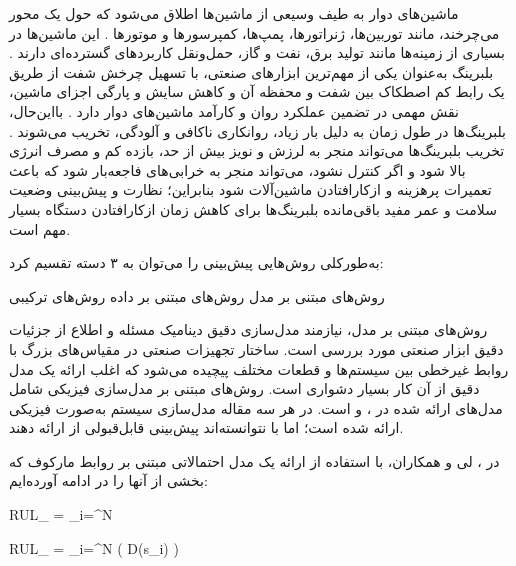 
\label{litreture}



ماشین‌های دوار به طیف وسیعی از ماشین‌ها اطلاق می‌شود که حول یک محور می‌چرخند، مانند توربین‌ها، ژنراتورها، پمپ‌ها، کمپرسورها و موتورها . این ماشین‌ها در بسیاری از زمینه‌ها مانند تولید برق، نفت و گاز، حمل‌ونقل کاربردهای گسترده‌ای دارند . بلبرینگ به‌عنوان یکی از مهم‌ترین ابزارهای صنعتی، با تسهیل چرخش شفت از طریق یک رابط کم اصطکاک بین شفت و محفظه آن و کاهش سایش و پارگی اجزای ماشین، نقش مهمی در تضمین عملکرد روان و کارآمد ماشین‌های دوار دارد . بااین‌حال، بلبرینگ‌ها در طول زمان به دلیل بار زیاد، روانکاری ناکافی و آلودگی، تخریب می‌شوند . تخریب بلبرینگ‌ها می‌تواند منجر به لرزش و نویز بیش از حد، بازده کم و مصرف انرژی بالا شود و اگر کنترل نشود، می‌تواند منجر به خرابی‌های فاجعه‌بار شود که باعث تعمیرات پرهزینه و ازکارافتادن ماشین‌آلات شود  بنابراین؛ نظارت و پیش‌بینی وضعیت سلامت و عمر مفید باقی‌مانده بلبرینگ‌ها برای کاهش زمان ازکارافتادن دستگاه بسیار مهم است.


 به‌طورکلی روش‌هایی پیش‌بینی  را می‌توان به ۳ دسته تقسیم کرد:
 
  روش‌های مبتنی بر مدل
  روش‌های مبتنی بر داده
  روش‌های ترکیبی
 


روش‌های مبتنی بر مدل، نیازمند مدل‌سازی دقیق دینامیک مسئله و اطلاع از جزئیات دقیق ابزار صنعتی مورد بررسی است. ساختار تجهیزات صنعتی در مقیاس‌های بزرگ با روابط غیرخطی بین سیستم‌ها و قطعات مختلف پیچیده می‌شود که اغلب ارائه یک مدل دقیق از آن کار بسیار دشواری است. روش‌های مبتنی بر مدل‌سازی فیزیکی شامل مدل‌های ارائه شده در ،  و  است. در هر سه مقاله مدل‌سازی سیستم به‌صورت فیزیکی ارائه شده است؛ اما با نتوانسته‌اند پیش‌بینی قابل‌قبولی از  ارائه دهند.


در ، لی و همکاران، با استفاده از ارائه یک مدل احتمالاتی مبتنی بر روابط مارکوف که بخشی از آنها را در ادامه آورده‌ایم:


RUL_{} = \sum_{i=}^{N} 





RUL_{} = \sum_{i=}^{N} \mu \left( D(s_i) \right)






